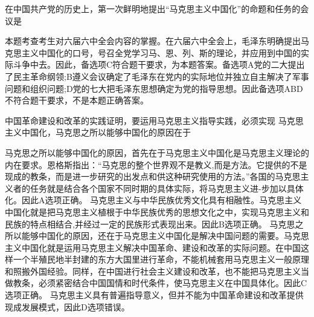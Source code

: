 \question 在中国共产党的历史上，第一次鲜明地提出``马克思主义中国化''的命题和任务的会议是
\par{}
\begin{solution}本题考查考生对六届六中全会内容的掌握。在六届六中全会上，毛泽东明确提出马克思主义中国化的口号，号召全党学习马、恩、列、斯的理论，并应用到中国的实际斗争中去。因此，备选项C符合题干要求，为本题答案。备选项A党的二大提出了民主革命纲领;B遵义会议确定了毛泽东在党内的实际地位并独立自主解决了军事问题和组织问题;D党的七大把毛泽东思想确定为党的指导思想。因此备选项ABD不符合题干要求，不是本题正确答案。
\end{solution}
\question 中国革命建设和改革的实践证明，要运用马克思主义指导实践，必须实现
马克思主义中国化，马克思之所以能够中国化的原因在于
\par{}
\begin{solution}马克思之所以能够中国化的原因，首先在于马克思主义中国化是马克思主义理论的内在要求。恩格斯指出：``马克思的整个世界观不是教义,而是方法。它提供的不是现成的教条，而是进一步研究的出发点和供这种研究使用的方法。''各国的马克思主义者的任务就是结合各个国家不同时期的具体实际，将马克思主义进-步加以具体化。因此A选项正确。
马克思主义与中华民族优秀文化具有相融性。马克思主义中国化就是把马克思主义植根于中华民族优秀的思想文化之中，实现马克思主义和民族的特点相结合,并经过一定的民族形式表现出来。因此B选项正确。
马克思之所以能够中国化的原因，还在于马克思主义中国化是解决中国问题的需要。马克思主义中国化就是运用马克思主义解决中国革命、建设和改革的实际问题。在中国这样一个半殖民地半封建的东方大国里进行革命，不能机械套用马克思主义一般原理和照搬外国经验。同样，在中国进行社会主义建设和改革，也不能把马克思主义当做教条，必须紧密结合中国国情和时代条件，使马克思主义在中国具体化。因此C选项正确。
马克思主义具有普遍指导意义，但并不能为中国革命建设和改革提供现成发展模式，因此D选项错误。
\end{solution}
